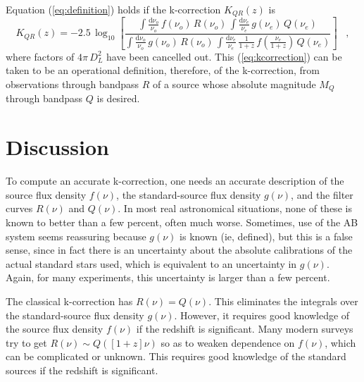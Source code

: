 \documentclass[12pt,preprint]{aastex}
\begin{document}
Equation (\ref{eq:definition}) holds if the k-correction $K_{QR}(z)$
is
\begin{equation}
\label{eq:kcorrection}
K_{QR}(z) = -2.5\,\log_{10}\left[
  \frac{\int\frac{\mathrm{d}\nu_o}{\nu_o}\,f(\nu_o)\,R(\nu_o)\,
        \int\frac{\mathrm{d}\nu_e}{\nu_e}\,
          g(\nu_e)\,Q(\nu_e)}
       {\int\frac{\mathrm{d}\nu_o}{\nu_o}\,g(\nu_o)\,R(\nu_o)\,
        \int\frac{\mathrm{d}\nu_e}{\nu_e}\,\frac{1}{1+z}\,
          f\left(\frac{\nu_e}{1+z}\right)\,Q(\nu_e)}
\right] \;\;\;,
\end{equation}
where factors of $4\pi\,D_L^2$ have been cancelled out.  This
(\ref{eq:kcorrection}) can be taken to be an operational definition,
therefore, of the k-correction, from observations through bandpass $R$
of a source whose absolute magnitude $M_Q$ through bandpass $Q$ is
desired.

\section{Discussion}

To compute an accurate k-correction, one needs an accurate description
of the source flux density $f(\nu)$, the standard-source flux density
$g(\nu)$, and the filter curves $R(\nu)$ and $Q(\nu)$.  In most real
astronomical situations, none of these is known to better than a few
percent, often much worse.  Sometimes, use of the AB system seems
reassuring because $g(\nu)$ is known (ie, defined), but this is a
false sense, since in fact there is an uncertainty about the absolute
calibrations of the actual standard stars used, which is equivalent to
an uncertainty in $g(\nu)$.  Again, for many experiments, this
uncertainty is larger than a few percent.

The classical k-correction has $R(\nu)=Q(\nu)$.  This eliminates the
integrals over the standard-source flux density $g(\nu)$.  However, it
requires good knowledge of the source flux density $f(\nu)$ if the
redshift is significant.  Many modern surveys try to get $R(\nu)\sim
Q([1+z]\nu)$ so as to weaken dependence on $f(\nu)$, which can be
complicated or unknown.  This requires good knowledge of the standard
sources if the redshift is significant.



\end{document}
